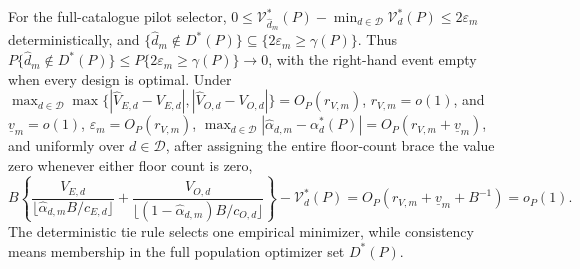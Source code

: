 For the full-catalogue pilot selector, \(0\le\mathcal V_{\widehat d_m}^*(P)-\min_{d\in\mathcal D}\mathcal V_d^*(P)\le2\varepsilon_m\) deterministically, and \(\{\widehat d_m\notin D^*(P)\}\subseteq\{2\varepsilon_m\ge\gamma(P)\}\). Thus \(P\{\widehat d_m\notin D^*(P)\}\le P\{2\varepsilon_m\ge\gamma(P)\}\to0\), with the right-hand event empty when every design is optimal. Under \(\max_{d\in\mathcal D}\max\{|\widehat V_{E,d}-V_{E,d}|,|\widehat V_{O,d}-V_{O,d}|\}=O_P(r_{V,m})\), \(r_{V,m}=o(1)\), and \(\underline v_m=o(1)\), \(\varepsilon_m=O_P(r_{V,m})\), \(\max_{d\in\mathcal D}|\widehat\alpha_{d,m}-\alpha_d^*(P)|=O_P(r_{V,m}+\underline v_m)\), and uniformly over \(d\in\mathcal D\), after assigning the entire floor-count brace the value zero whenever either floor count is zero,
\[
B\left\{\frac{V_{E,d}}{\lfloor\widehat\alpha_{d,m}B/c_{E,d}\rfloor}+\frac{V_{O,d}}{\lfloor(1-\widehat\alpha_{d,m})B/c_{O,d}\rfloor}\right\}-\mathcal V_d^*(P)=O_P(r_{V,m}+\underline v_m+B^{-1})=o_P(1).
\]
The deterministic tie rule selects one empirical minimizer, while consistency means membership in the full population optimizer set \(D^*(P)\).